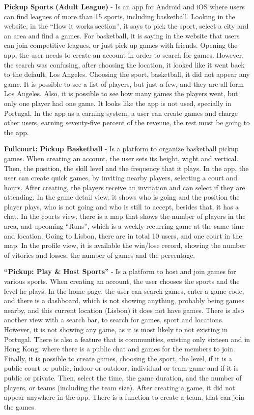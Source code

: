 \textbf{Pickup Sports (Adult League)}\cite{pickup-adult, pickup-adult-app} - Is an app for Android and iOS where users can find leagues of more than 15 sports, including basketball.
Looking in the website\cite{pickup-adult}, in the ``How it works section'', it says to pick the sport, select a city and an area and find a games.
For basketball, it is saying in the website that users can join competitive leagues, or just pick up games with friends.
Opening the app, the user needs to create an account in order to search for games.
However, the search was confusing, after choosing the location, it looked like it went back to the default, Los Angeles.
Choosing the sport, basketball, it did not appear any game.
It is possible to see a list of players, but just a few, and they are all form Los Angeles.
Also, it is possible to see how many games the players went, but only one player had one game.
It looks like the app is not used, specially in Portugal.
In the app as a earning system, a user can create games and charge other users, earning seventy-five percent of the revenue, the rest must be going to the app.

\textbf{Fullcourt: Pickup Basketball}\cite{fullcourt, fullcourt-pp} - Is a platform to organize basketball pickup games.
When creating an account, the user sets its height, wight and vertical.
Then, the position, the skill level and the frequency that it plays.
In the app, the user can create quick games, by inviting nearby players, selecting a court and hours.
After creating, the players receive an invitation and can select if they are attending.
In the game detail view, it shows who is going and the position the player plays, who is not going and who is still to accept, besides that, it has a chat.
In the courts view, there is a map that shows the number of players in the area, and upcoming ``Runs'', which is a weekly recurring game at the same time and location.
Going to Lisbon, there are in total 10 users, and one court in the map.
In the profile view, it is available the win/lose record, showing the number of vitories and losses, the number of games and the percentage.

\textbf{``Pickup: Play \& Host Sports''}\cite{pickup, pickup-app} - Is a platform to host and join games for various sports.
When creating an account, the user chooses the sports and the level he plays.
In the home page, the user can search games, enter a game code, and there is a dashboard, which is not showing anything, probably being games nearby, and this current location (Lisbon) it does not have games.
There is also another view with a search bar, to search for games, sport and locations.
However, it is not showing any game, as it is most likely to not existing in Portugal.
There is also a feature that is communities, existing only sixteen and in Hong Kong, where there is a public chat and games for the members to join.
Finally, it is possible to create games, choosing the sport, the level, if it is a public court or public, indoor or outdoor, individual or team game and if it is public or private.
Then, select the time, the game duration, and the number of players, or teams (including the team size).
After creating a game, it did not appear anywhere in the app.
There is a function to create a team, that can join the games.

